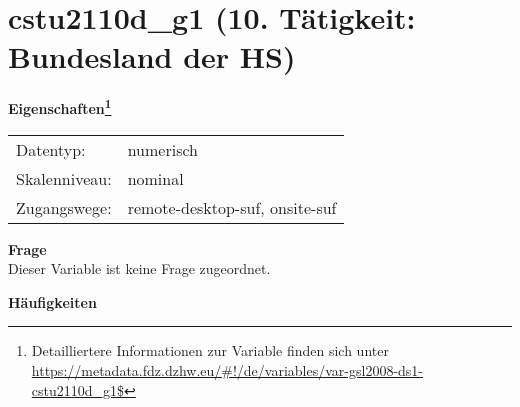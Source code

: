 
    \setcounter{footnote}{0}

    \vspace*{-1.8cm}
	\section{cstu2110d\_g1 (10. Tätigkeit: Bundesland der HS)}
	\label{section:cstu2110d_g1}



    \vspace*{0.5cm}
    \noindent\textbf{Eigenschaften\footnote{Detailliertere Informationen zur Variable finden sich unter
		\url{https://metadata.fdz.dzhw.eu/\#!/de/variables/var-gsl2008-ds1-cstu2110d_g1$}}}\\
	\begin{tabularx}{\hsize}{@{}lX}
	Datentyp: & numerisch \\
	Skalenniveau: & nominal \\
	Zugangswege: &
	  remote-desktop-suf, 
	  onsite-suf
 \\
    \end{tabularx}



		\vspace*{0.5cm}
		\noindent\textbf{Frage}\\
		Dieser Variable ist keine Frage zugeordnet.





        		\vspace*{0.5cm}
                \noindent\textbf{Häufigkeiten}

